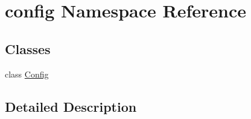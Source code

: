 \hypertarget{namespaceconfig}{}\section{config Namespace Reference}
\label{namespaceconfig}
\subsection*{Classes}
\begin{DoxyCompactItemize}
\item 
class \hyperlink{classconfig_1_1Config}{Config}
\end{DoxyCompactItemize}


\subsection{Detailed Description}
\begin{DoxyVerb}\end{DoxyVerb}
 